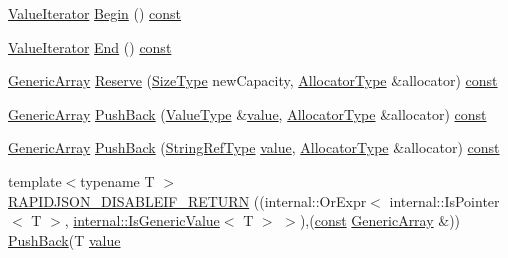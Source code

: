 \begin{DoxyCompactItemize}
\item 
\hyperlink{classGenericArray_afc6ad62c3f00531fa378db266182704a}{Value\+Iterator} \hyperlink{classGenericArray_a3efaa020b29ceed9c1a03465676a32a7}{Begin} () \hyperlink{classGenericArray_a25d2ed55daa117c41db6a5b3f87e9ddc}{const}
\item 
\hyperlink{classGenericArray_afc6ad62c3f00531fa378db266182704a}{Value\+Iterator} \hyperlink{classGenericArray_a396f83d328f4879225106ea14b1dca84}{End} () \hyperlink{classGenericArray_a25d2ed55daa117c41db6a5b3f87e9ddc}{const}
\item 
\hyperlink{classGenericArray}{Generic\+Array} \hyperlink{classGenericArray_a7c74901e8e2174fe4661f4848995f355}{Reserve} (\hyperlink{rapidjson_8h_a5ed6e6e67250fadbd041127e6386dcb5}{Size\+Type} new\+Capacity, \hyperlink{classGenericArray_af9cdc12de03c742b9c33dfc172756b97}{Allocator\+Type} \&allocator) \hyperlink{classGenericArray_a25d2ed55daa117c41db6a5b3f87e9ddc}{const}
\item 
\hyperlink{classGenericArray}{Generic\+Array} \hyperlink{classGenericArray_a2ed88f0630c044bad695a127a866c348}{Push\+Back} (\hyperlink{classGenericArray_a93e53f38a99fc5167eb2a28653de64ed}{Value\+Type} \&\hyperlink{imgui__impl__opengl3__loader_8h_a32aff7c6c4cd253fdf6563677afab5ce}{value}, \hyperlink{classGenericArray_af9cdc12de03c742b9c33dfc172756b97}{Allocator\+Type} \&allocator) \hyperlink{classGenericArray_a25d2ed55daa117c41db6a5b3f87e9ddc}{const}
\item 
\hyperlink{classGenericArray}{Generic\+Array} \hyperlink{classGenericArray_ae599de6aee1167648085672b79dd6bcc}{Push\+Back} (\hyperlink{classGenericArray_a8dcb9e2a2e103ce1051c16a7486465b9}{String\+Ref\+Type} \hyperlink{imgui__impl__opengl3__loader_8h_a32aff7c6c4cd253fdf6563677afab5ce}{value}, \hyperlink{classGenericArray_af9cdc12de03c742b9c33dfc172756b97}{Allocator\+Type} \&allocator) \hyperlink{classGenericArray_a25d2ed55daa117c41db6a5b3f87e9ddc}{const}
\item 
{\footnotesize template$<$typename T $>$ }\\\hyperlink{classGenericArray_a12adff0c1e11aa3be6f4160015a65df0}{R\+A\+P\+I\+D\+J\+S\+O\+N\+\_\+\+D\+I\+S\+A\+B\+L\+E\+I\+F\+\_\+\+R\+E\+T\+U\+RN} ((internal\+::\+Or\+Expr$<$ internal\+::\+Is\+Pointer$<$ T $>$, \hyperlink{structinternal_1_1IsGenericValue}{internal\+::\+Is\+Generic\+Value}$<$ T $>$ $>$),(\hyperlink{classGenericArray_a25d2ed55daa117c41db6a5b3f87e9ddc}{const} \hyperlink{classGenericArray}{Generic\+Array} \&)) \hyperlink{classGenericArray_a2ed88f0630c044bad695a127a866c348}{Push\+Back}(T \hyperlink{imgui__impl__opengl3__loader_8h_a32aff7c6c4cd253fdf6563677afab5ce}{value}

\end{DoxyCompactItemize}
